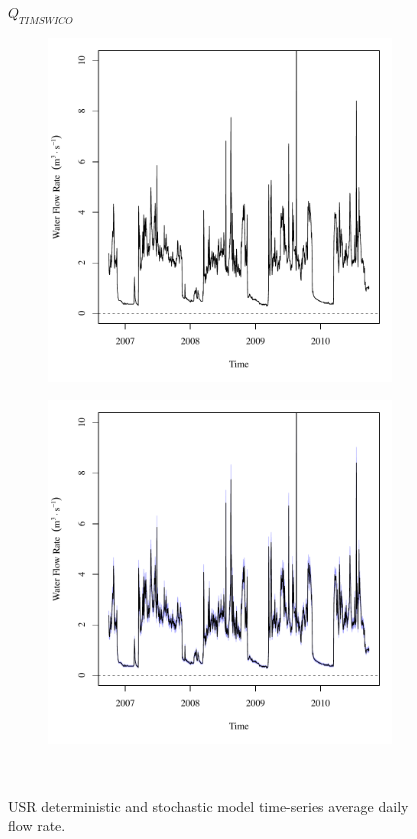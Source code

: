 \subfiguremid
\begin{landscape}
	\begin{figure}
		\centering
		$ Q_{TIMSWICO} $
		\begin{subfigure}{0.7\textwidth}
			\centering
			\includegraphics[width=\tableCustomSize]{"Figures/Results_USR/Deterministic/Q TIM"}
		\end{subfigure}%
		\begin{subfigure}{0.7\textwidth}
			\centering
			\includegraphics[width=\tableCustomSize]{"Figures/Results_USR/Stochastic/Q TIM"}
		\end{subfigure}\\
		\caption{USR deterministic and stochastic model time-series average daily flow rate.}
	\end{figure}
\end{landscape}
